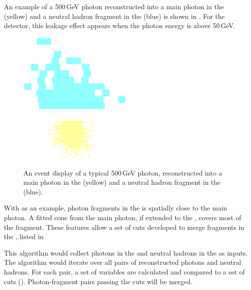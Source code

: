 An example of a 500\,GeV photon reconstructed into a main photon in the \ECAL (yellow) and a neutral hadron fragment in the \HCAL (blue) is shown in . For the \ILD detector, this \ECAL leakage effect appears when the photon energy is above 50\,GeV.


\begin{figure}[tbph]
\centering
{\includegraphics[width=0.5\textwidth]{photon/hcalfrag}}%
\caption{An event display of a typical 500\,GeV photon, reconstructed into a main photon in the \ECAL (yellow) and a neutral hadron fragment in the \HCAL (blue).}
\label{fig:photonEvtDspHCalFrag}
\end{figure}

With  as an example, photon fragments in the \HCAL is spatially close to the main photon. A fitted cone from the main photon, if extended to the \HCAL, covers most of the fragment. These features allow a set of cuts developed to merge  fragments in the \HCAL, listed in 

This algorithm would collect photons in the \ECAL and neutral hadrons in the \HCAL as inputs. The algorithm would iterate over all pairs of reconstructed photons and neutral hadrons. For each pair, a set of variables are calculated and compared to a set of cuts (). Photon-fragment pairs passing the cuts will be merged.

